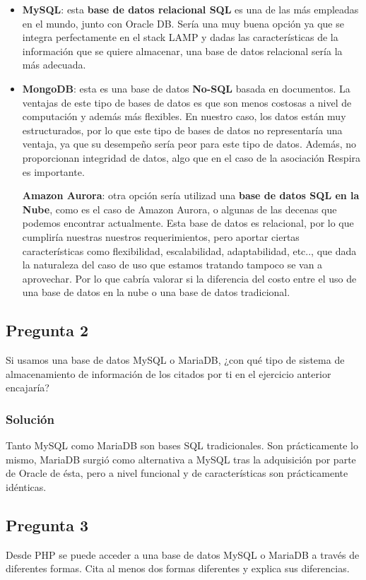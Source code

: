 \begin{itemize}
    \item \textbf{MySQL}: esta \textbf{base de datos relacional SQL} es una de las más empleadas en el mundo, junto con Oracle DB. Sería una muy buena opción ya que se integra perfectamente
    en el stack LAMP y dadas las características de la información que se quiere almacenar, una base de datos relacional sería la más adecuada.

    \item \textbf{MongoDB}: esta es una base de datos \textbf{No-SQL} basada en documentos. La ventajas de este tipo de bases de datos es que son menos costosas a nivel de computación y además más flexibles. En nuestro caso, los datos están muy estructurados, por lo que este tipo de bases de datos no representaría una ventaja, ya que su desempeño sería peor para este tipo de datos. Además, no proporcionan integridad de datos, algo que en el caso de la asociación Respira es importante.

    \textbf{Amazon Aurora}: otra opción sería utilizad una \textbf{base de datos SQL en la Nube}, como es el caso de Amazon Aurora, o algunas de las decenas que podemos encontrar actualmente. Esta base de datos es relacional, por lo que cumpliría nuestras nuestros requerimientos, pero aportar ciertas características como flexibilidad, escalabilidad, adaptabilidad, etc.., que dada la naturaleza del caso de uso que estamos tratando tampoco se van a aprovechar. Por lo que cabría valorar si la diferencia del costo entre el uso de una base de datos en la nube o una base de datos tradicional.
\end{itemize}

\subsection{Pregunta 2}
Si usamos una base de datos MySQL o MariaDB, ¿con qué tipo de sistema de almacenamiento de información de los citados por ti en el ejercicio anterior encajaría?

\subsubsection{Solución}
Tanto MySQL como MariaDB son bases SQL tradicionales. Son prácticamente lo mismo, MariaDB surgió como alternativa a MySQL tras la adquisición por parte de Oracle de ésta, pero a nivel funcional y de características son prácticamente idénticas.

\subsection{Pregunta 3}
Desde PHP se puede acceder a una base de datos MySQL o MariaDB a través de diferentes formas. Cita al menos dos formas diferentes y explica sus diferencias.

